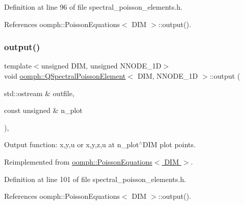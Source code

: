 Definition at line 96 of file spectral\+\_\+poisson\+\_\+elements.\+h.



References oomph\+::\+Poisson\+Equations$<$ D\+I\+M $>$\+::output().

\mbox{\label{classoomph_1_1QSpectralPoissonElement_a09f0813f51286ed47f4e89536e8c4e2e}} 
\subsubsection{\texorpdfstring{output()}{output()}\hspace{0.1cm}{\footnotesize\ttfamily [2/4]}}
{\footnotesize\ttfamily template$<$unsigned D\+IM, unsigned N\+N\+O\+D\+E\+\_\+1D$>$ \\
void \hyperlink{classoomph_1_1QSpectralPoissonElement}{oomph\+::\+Q\+Spectral\+Poisson\+Element}$<$ D\+IM, N\+N\+O\+D\+E\+\_\+1D $>$\+::output (\begin{DoxyParamCaption}\item[{std\+::ostream \&}]{outfile,  }\item[{const unsigned \&}]{n\+\_\+plot }\end{DoxyParamCaption})\hspace{0.3cm}{\ttfamily [inline]}, {\ttfamily [virtual]}}



Output function\+: x,y,u or x,y,z,u at n\+\_\+plot$^\wedge$\+D\+IM plot points. 



Reimplemented from \hyperlink{classoomph_1_1PoissonEquations_a6683dd0afc16bfddf4e79b6e0e449d43}{oomph\+::\+Poisson\+Equations$<$ D\+I\+M $>$}.



Definition at line 101 of file spectral\+\_\+poisson\+\_\+elements.\+h.



References oomph\+::\+Poisson\+Equations$<$ D\+I\+M $>$\+::output().

\mbox{\label{classoomph_1_1QSpectralPoissonElement_ac5588896f64d8c24a896dc0b30e7ec29}} 

